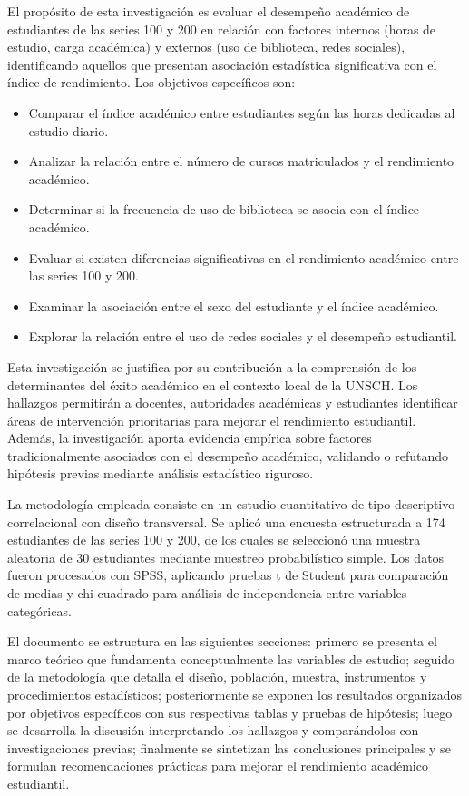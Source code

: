\documentclass[
  stu,
  floatsintext,
  longtable,
  a4paper,
  nolmodern,
  notxfonts,
  notimes,
  12pt,
  colorlinks=true,linkcolor=blue,citecolor=blue,urlcolor=blue]{apa7}
\providecommand{\tightlist}{%
  \setlength{\itemsep}{0pt}\setlength{\parskip}{0pt}}
\begin{document}
El propósito de esta investigación es evaluar el desempeño académico de
estudiantes de las series 100 y 200 en relación con factores internos
(horas de estudio, carga académica) y externos (uso de biblioteca, redes
sociales), identificando aquellos que presentan asociación estadística
significativa con el índice de rendimiento. Los objetivos específicos
son:

\begin{itemize}
\tightlist
\item
  Comparar el índice académico entre estudiantes según las horas
  dedicadas al estudio diario.
\item
  Analizar la relación entre el número de cursos matriculados y el
  rendimiento académico.
\item
  Determinar si la frecuencia de uso de biblioteca se asocia con el
  índice académico.
\item
  Evaluar si existen diferencias significativas en el rendimiento
  académico entre las series 100 y 200.
\item
  Examinar la asociación entre el sexo del estudiante y el índice
  académico.
\item
  Explorar la relación entre el uso de redes sociales y el desempeño
  estudiantil.
\end{itemize}

Esta investigación se justifica por su contribución a la comprensión de
los determinantes del éxito académico en el contexto local de la UNSCH.
Los hallazgos permitirán a docentes, autoridades académicas y
estudiantes identificar áreas de intervención prioritarias para mejorar
el rendimiento estudiantil. Además, la investigación aporta evidencia
empírica sobre factores tradicionalmente asociados con el desempeño
académico, validando o refutando hipótesis previas mediante análisis
estadístico riguroso.

La metodología empleada consiste en un estudio cuantitativo de tipo
descriptivo-correlacional con diseño transversal. Se aplicó una encuesta
estructurada a 174 estudiantes de las series 100 y 200, de los cuales se
seleccionó una muestra aleatoria de 30 estudiantes mediante muestreo
probabilístico simple. Los datos fueron procesados con SPSS, aplicando
pruebas t de Student para comparación de medias y chi-cuadrado para
análisis de independencia entre variables categóricas.

El documento se estructura en las siguientes secciones: primero se
presenta el marco teórico que fundamenta conceptualmente las variables
de estudio; seguido de la metodología que detalla el diseño, población,
muestra, instrumentos y procedimientos estadísticos; posteriormente se
exponen los resultados organizados por objetivos específicos con sus
respectivas tablas y pruebas de hipótesis; luego se desarrolla la
discusión interpretando los hallazgos y comparándolos con
investigaciones previas; finalmente se sintetizan las conclusiones
principales y se formulan recomendaciones prácticas para mejorar el
rendimiento académico estudiantil.
\end{document}
